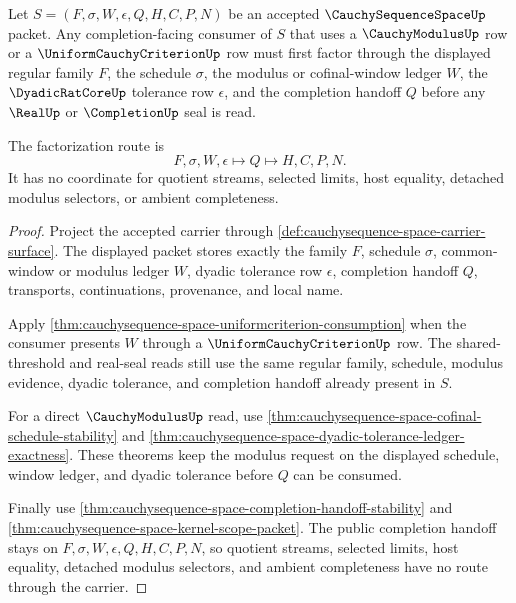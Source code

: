 \begin{theorem}
\label{thm:cauchysequence-space-modulus-family-factorization}
Let $S=(F,\sigma,W,\epsilon,Q,H,C,P,N)$ be an accepted $\CauchySequenceSpaceUp$ packet. Any completion-facing consumer of $S$ that uses a $\CauchyModulusUp$ row or a $\UniformCauchyCriterionUp$ row must first factor through the displayed regular family $F$, the schedule $\sigma$, the modulus or cofinal-window ledger $W$, the $\DyadicRatCoreUp$ tolerance row $\epsilon$, and the completion handoff $Q$ before any $\RealUp$ or $\CompletionUp$ seal is read.

The factorization route is
$$
F,\sigma,W,\epsilon \longmapsto Q \longmapsto H,C,P,N .
$$
It has no coordinate for quotient streams, selected limits, host equality, detached modulus selectors, or ambient completeness.
\end{theorem}
\begin{proof}
Project the accepted carrier through \autoref{def:cauchysequence-space-carrier-surface}. The displayed packet stores exactly the family $F$, schedule $\sigma$, common-window or modulus ledger $W$, dyadic tolerance row $\epsilon$, completion handoff $Q$, transports, continuations, provenance, and local name.

Apply \autoref{thm:cauchysequence-space-uniformcriterion-consumption} when the consumer presents $W$ through a $\UniformCauchyCriterionUp$ row. The shared-threshold and real-seal reads still use the same regular family, schedule, modulus evidence, dyadic tolerance, and completion handoff already present in $S$.

For a direct $\CauchyModulusUp$ read, use \autoref{thm:cauchysequence-space-cofinal-schedule-stability} and \autoref{thm:cauchysequence-space-dyadic-tolerance-ledger-exactness}. These theorems keep the modulus request on the displayed schedule, window ledger, and dyadic tolerance before $Q$ can be consumed.

Finally use \autoref{thm:cauchysequence-space-completion-handoff-stability} and \autoref{thm:cauchysequence-space-kernel-scope-packet}. The public completion handoff stays on $F,\sigma,W,\epsilon,Q,H,C,P,N$, so quotient streams, selected limits, host equality, detached modulus selectors, and ambient completeness have no route through the carrier.
\end{proof}

